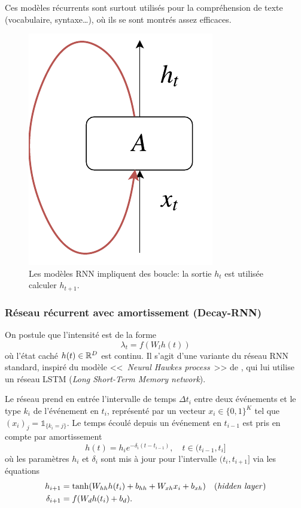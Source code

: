 \documentclass[../main.tex]{subfiles}
\begin{document}
Ces modèles récurrents sont surtout utilisés pour la compréhension de texte (vocabulaire, syntaxe\ldots), où ils se sont montrés assez efficaces. \cite{unreasonableEffectivenessRNN}

\begin{figure}
	\centering
	\includegraphics[height=0.2\textheight]{diagrams/rnn.pdf}
	\caption{Les modèles RNN impliquent des boucle: la sortie $h_t$ est utilisée calculer $h_{t+1}$.}\label{fig:simpleRNN}
\end{figure}

\subsubsection{Réseau récurrent avec amortissement (Decay-RNN)}

On postule que l'intensité est de la forme
\begin{equation}\label{eq:decayrnnhiddenstate}
\lambda_t = f(W_l h(t))
\end{equation}
où l'état caché $h(t)\in\mathbb{R}^D$ est continu. Il s'agit d'une variante du réseau RNN standard, inspiré du modèle <<~\textit{Neural Hawkes process}~>> de \citeauthor{meiEisnerNeuralHawkes} \cite{meiEisnerNeuralHawkes}, qui lui utilise un réseau LSTM (\textit{Long Short-Term Memory network}).

Le réseau prend en entrée l'intervalle de temps $\Delta t_i$ entre deux événements et le type $k_i$ de l'événement en $t_i$, représenté par un vecteur $x_i\in{\{0,1\}}^K$ tel que $(x_i)_j = \mathds{1}_{\{k_i = j\}}$\footnotemark.
Le temps écoulé depuis un événement en $t_{i-1}$ est pris en compte par amortissement
\begin{equation}
h(t) = h_{i}e^{-\delta_i(t-t_{i-1})},\quad t\in(t_{i-1},t_i]
\end{equation}
où les paramètres $h_i$ et $\delta_i$ sont mis à jour pour l'intervalle $(t_i,t_{i+1}]$ via les équations
\begin{subequations}
	\begin{align}
	h_{i+1} &= \tanh(W_{hh}h(t_i) + b_{hh} + W_{xh}x_i + b_{xh})\quad\text{(\textit{hidden layer})} \\
	\delta_{i+1} &= f(W_dh(t_i) + b_d).
	\end{align}
\end{subequations}
\end{document}
